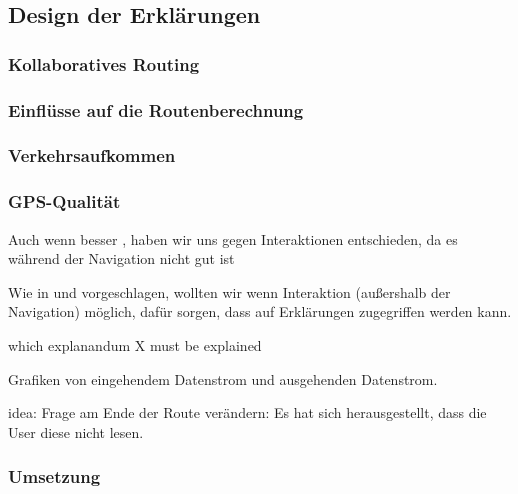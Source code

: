 \subsection{Design der Erklärungen}

\subsubsection{Kollaboratives Routing}
\label{sec:06_model_evaluation_user_count_definition}

\subsubsection{Einflüsse auf die Routenberechnung}
\label{sec:06_model_evaluation_rotue_explanation_definition}

\subsubsection{Verkehrsaufkommen}
\label{06_model_evaluation:traffic_volume_definition}

\subsubsection{GPS-Qualität}
\label{06_model_evaluation:gps_accuracy_definition}

Auch wenn besser \cite{riveiro_thats_2021}, haben wir uns gegen Interaktionen entschieden, da es während der Navigation nicht gut ist

Wie in \cite{chazette_end-users_nodate} und \cite{wang_integration_2020} vorgeschlagen, wollten wir wenn Interaktion (außershalb der Navigation) möglich, dafür sorgen, dass auf Erklärungen zugegriffen werden kann.

which explanandum X must be explained \cite{kohl_explainability_2019}

Grafiken von eingehendem Datenstrom und ausgehenden Datenstrom.

idea: Frage am Ende der Route verändern: Es hat sich herausgestellt, dass die User diese nicht lesen.

\subsubsection{Umsetzung}